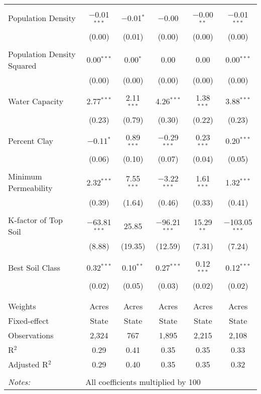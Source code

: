 \documentclass[10pt]{article}
\begin{document}
\begin{table}[!htbp]
\begin{tabular}{@{\extracolsep{5pt}}lccccc}
  & & & & & \\ 
 Population Density & $-$0.01$^{***}$ & $-$0.01$^{*}$ & $-$0.00 & $-$0.00$^{**}$ & $-$0.01$^{***}$ \\ 
  & (0.00) & (0.01) & (0.00) & (0.00) & (0.00) \\ 
  & & & & & \\ 
 Population Density Squared & 0.00$^{***}$ & 0.00$^{*}$ & 0.00 & 0.00 & 0.00$^{***}$ \\ 
  & (0.00) & (0.00) & (0.00) & (0.00) & (0.00) \\ 
  & & & & & \\ 
 Water Capacity & 2.77$^{***}$ & 2.11$^{***}$ & 4.26$^{***}$ & 1.38$^{***}$ & 3.88$^{***}$ \\ 
  & (0.23) & (0.79) & (0.30) & (0.22) & (0.23) \\ 
  & & & & & \\ 
 Percent Clay & $-$0.11$^{*}$ & 0.89$^{***}$ & $-$0.29$^{***}$ & 0.23$^{***}$ & 0.20$^{***}$ \\ 
  & (0.06) & (0.10) & (0.07) & (0.04) & (0.05) \\ 
  & & & & & \\ 
 Minimum Permeability & 2.32$^{***}$ & 7.55$^{***}$ & $-$3.22$^{***}$ & 1.61$^{***}$ & 1.32$^{***}$ \\ 
  & (0.39) & (1.64) & (0.46) & (0.33) & (0.41) \\ 
  & & & & & \\ 
 K-factor of Top Soil & $-$63.81$^{***}$ & 25.85 & $-$96.21$^{***}$ & 15.29$^{**}$ & $-$103.05$^{***}$ \\ 
  & (8.88) & (19.35) & (12.59) & (7.31) & (7.24) \\ 
  & & & & & \\ 
 Best Soil Class & 0.32$^{***}$ & 0.10$^{**}$ & 0.27$^{***}$ & 0.12$^{***}$ & 0.12$^{***}$ \\ 
  & (0.02) & (0.05) & (0.03) & (0.02) & (0.02) \\ 
  & & & & & \\ 
\hline \\[-1.8ex] 
Weights & Acres & Acres & Acres & Acres & Acres \\ 
Fixed-effect & State & State & State & State & State \\ 
Observations & 2,324 & 767 & 1,895 & 2,215 & 2,108 \\ 
R$^{2}$ & 0.29 & 0.41 & 0.35 & 0.35 & 0.33 \\ 
Adjusted R$^{2}$ & 0.29 & 0.40 & 0.35 & 0.35 & 0.32 \\ 
\hline 
\hline \\[-1.8ex] 
\textit{Notes:} & \multicolumn{5}{l}{All coefficients multiplied by 100} \\ 
\end{tabular} 
\end{table} 
\end{document}
